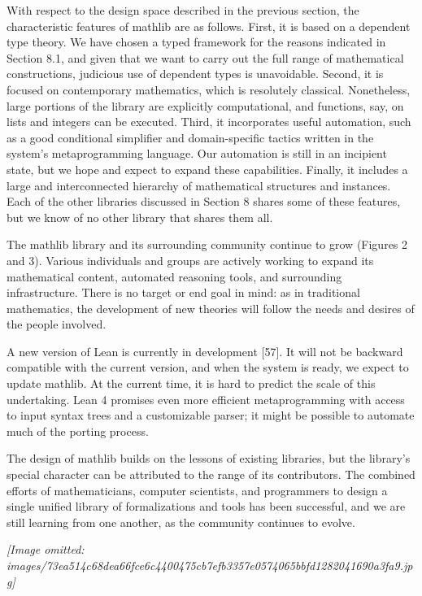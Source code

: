 \documentclass[
]{article}
\begin{document}
With respect to the design space described in the previous section, the
characteristic features of mathlib are as follows. First, it is based on
a dependent type theory. We have chosen a typed framework for the
reasons indicated in Section 8.1, and given that we want to carry out
the full range of mathematical constructions, judicious use of dependent
types is unavoidable. Second, it is focused on contemporary mathematics,
which is resolutely classical. Nonetheless, large portions of the
library are explicitly computational, and functions, say, on lists and
integers can be executed. Third, it incorporates useful automation, such
as a good conditional simplifier and domain-specific tactics written in
the system's metaprogramming language. Our automation is still in an
incipient state, but we hope and expect to expand these capabilities.
Finally, it includes a large and interconnected hierarchy of
mathematical structures and instances. Each of the other libraries
discussed in Section 8 shares some of these features, but we know of no
other library that shares them all.

The mathlib library and its surrounding community continue to grow
(Figures 2 and 3). Various individuals and groups are actively working
to expand its mathematical content, automated reasoning tools, and
surrounding infrastructure. There is no target or end goal in mind: as
in traditional mathematics, the development of new theories will follow
the needs and desires of the people involved.

A new version of Lean is currently in development {[}57{]}. It will not
be backward compatible with the current version, and when the system is
ready, we expect to update mathlib. At the current time, it is hard to
predict the scale of this undertaking. Lean 4 promises even more
efficient metaprogramming with access to input syntax trees and a
customizable parser; it might be possible to automate much of the
porting process.

The design of mathlib builds on the lessons of existing libraries, but
the library's special character can be attributed to the range of its
contributors. The combined efforts of mathematicians, computer
scientists, and programmers to design a single unified library of
formalizations and tools has been successful, and we are still learning
from one another, as the community continues to evolve.

\textit{[Image omitted: images/73ea514c68dea66fce6c4400475cb7efb3357e0574065bbfd1282041690a3fa9.jpg]}
\end{document}
